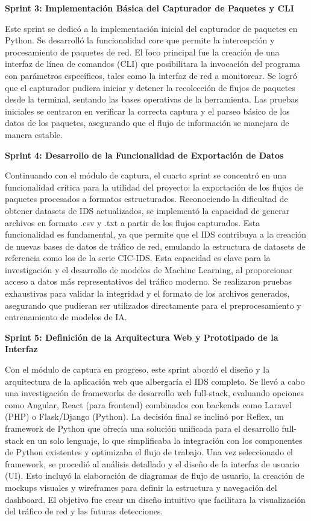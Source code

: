 \textbf{Sprint 3: Implementación Básica del Capturador de Paquetes y CLI}

Este sprint se dedicó a la implementación inicial del capturador de paquetes en Python. Se desarrolló la funcionalidad core que permite la intercepción y procesamiento de paquetes de red. El foco principal fue la creación de una interfaz de línea de comandos (CLI) que posibilitara la invocación del programa con parámetros específicos, tales como la interfaz de red a monitorear. Se logró que el capturador pudiera iniciar y detener la recolección de flujos de paquetes desde la terminal, sentando las bases operativas de la herramienta. Las pruebas iniciales se centraron en verificar la correcta captura y el parseo básico de los datos de los paquetes, asegurando que el flujo de información se manejara de manera estable.

\textbf{Sprint 4: Desarrollo de la Funcionalidad de Exportación de Datos}

Continuando con el módulo de captura, el cuarto sprint se concentró en una funcionalidad crítica para la utilidad del proyecto: la exportación de los flujos de paquetes procesados a formatos estructurados. Reconociendo la dificultad de obtener datasets de IDS actualizados, se implementó la capacidad de generar archivos en formato .csv y .txt a partir de los flujos capturados. Esta funcionalidad es fundamental, ya que permite que el IDS contribuya a la creación de nuevas bases de datos de tráfico de red, emulando la estructura de datasets de referencia como los de la serie CIC-IDS. Esta capacidad es clave para la investigación y el desarrollo de modelos de Machine Learning, al proporcionar acceso a datos más representativos del tráfico moderno. Se realizaron pruebas exhaustivas para validar la integridad y el formato de los archivos generados, asegurando que pudieran ser utilizados directamente para el preprocesamiento y entrenamiento de modelos de IA.

\textbf{Sprint 5: Definición de la Arquitectura Web y Prototipado de la Interfaz}

Con el módulo de captura en progreso, este sprint abordó el diseño y la arquitectura de la aplicación web que albergaría el IDS completo. Se llevó a cabo una investigación de frameworks de desarrollo web full-stack, evaluando opciones como Angular, React (para frontend) combinados con backends como Laravel (PHP) o Flask/Django (Python). La decisión final se inclinó por Reflex, un framework de Python que ofrecía una solución unificada para el desarrollo full-stack en un solo lenguaje, lo que simplificaba la integración con los componentes de Python existentes y optimizaba el flujo de trabajo. Una vez seleccionado el framework, se procedió al análisis detallado y el diseño de la interfaz de usuario (UI). Esto incluyó la elaboración de diagramas de flujo de usuario, la creación de mockups visuales y wireframes para definir la estructura y navegación del dashboard. El objetivo fue crear un diseño intuitivo que facilitara la visualización del tráfico de red y las futuras detecciones.

